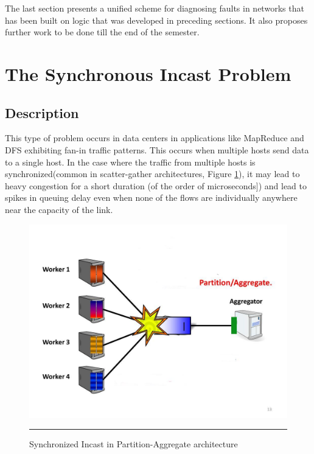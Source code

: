 The last section presents a unified scheme for diagnosing faults in networks that has been built on logic that was developed
in preceding sections. It also proposes further work to be done till the end of the semester.
\section{The Synchronous Incast Problem}

\subsection{Description}

This type of problem occurs in data centers in applications like MapReduce and DFS exhibiting fan-in traffic patterns.
This occurs when multiple hosts send data to a single host. In the case where the traffic from multiple hosts is
synchronized(common in scatter-gather architectures, Figure \ref{fig:Synch Incast}), it may lead to heavy congestion for a short duration (of the
order of microseconds]\cite{microburst}) and lead to spikes in queuing delay even when none of the flows are individually anywhere near
the capacity of the link.

\begin{figure}[htbp]
	\centering
		\includegraphics[width=0.65\columnwidth]{Figures/sync_incast.jpg}
		\rule{35em}{0.5pt}
	\caption[Synchronized Incast]{Synchronized Incast in Partition-Aggregate architecture}
	\label{fig:Synch Incast}
\end{figure}

